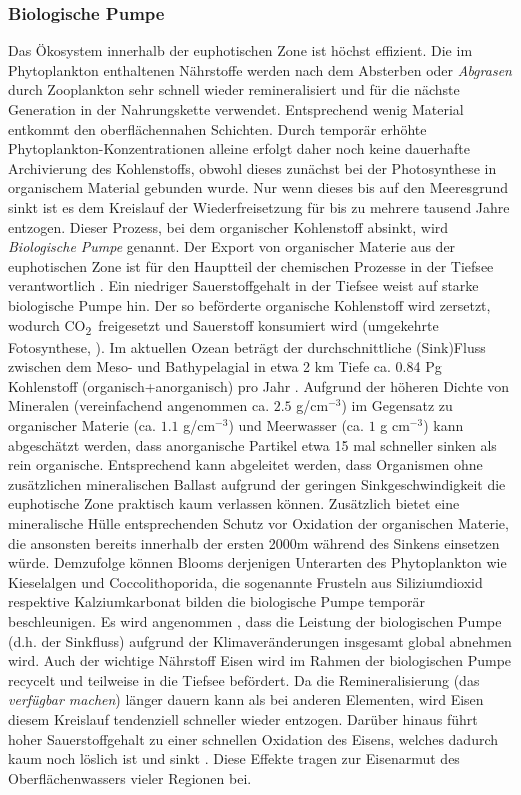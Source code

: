 \documentclass[12pt,a4paper,onecolumn,draft]{scrartcl}
\newcommand{\cotwo}{CO\textsubscript{2}}
\begin{document}
\subsubsection{Biologische Pumpe} \label{sec:biopump}
Das Ökosystem innerhalb der euphotischen Zone ist höchst effizient. Die im Phytoplankton enthaltenen Nährstoffe werden nach dem Absterben oder \textit{Abgrasen} durch Zooplankton sehr schnell wieder remineralisiert und für die nächste Generation in der Nahrungskette verwendet. Entsprechend wenig Material entkommt den oberflächennahen Schichten. Durch temporär erhöhte Phytoplankton-Konzentrationen alleine erfolgt daher noch keine dauerhafte Archivierung des Kohlenstoffs, obwohl dieses zunächst bei der Photosynthese in organischem Material gebunden wurde. Nur wenn dieses bis auf den Meeresgrund sinkt ist es dem Kreislauf der Wiederfreisetzung für bis zu mehrere tausend Jahre entzogen. Dieser Prozess, bei dem organischer Kohlenstoff absinkt, wird \textit{Biologische Pumpe} genannt. Der Export von organischer Materie aus der euphotischen Zone ist für den Hauptteil der chemischen Prozesse in der Tiefsee verantwortlich \citep{Emerson.2009}. Ein niedriger Sauerstoffgehalt in der Tiefsee weist auf starke biologische Pumpe hin. Der so beförderte organische Kohlenstoff wird zersetzt, wodurch \cotwo \ freigesetzt und Sauerstoff konsumiert wird (umgekehrte Fotosynthese, \cite{Honjo.2008}). Im aktuellen Ozean beträgt der durchschnittliche (Sink)Fluss zwischen dem Meso- und Bathypelagial in etwa 2 km Tiefe ca. 0.84 Pg Kohlenstoff (organisch+anorganisch) pro Jahr \citep{Honjo.2008}. Aufgrund der höheren Dichte von Mineralen (vereinfachend angenommen ca. $2.5$ g/cm$^{-3}$) im Gegensatz zu organischer Materie (ca. $1.1$ g/cm$^{-3}$) und Meerwasser (ca. $1$ g cm$^{-3}$) kann abgeschätzt werden, dass anorganische Partikel etwa 15 mal schneller sinken als rein organische. Entsprechend kann abgeleitet werden, dass Organismen ohne zusätzlichen mineralischen Ballast aufgrund der geringen Sinkgeschwindigkeit die euphotische Zone praktisch kaum verlassen können. Zusätzlich bietet eine mineralische Hülle entsprechenden Schutz vor Oxidation der organischen Materie, die ansonsten bereits innerhalb der ersten 2000m während des Sinkens einsetzen würde\citep{Emerson.2009}. Demzufolge können Blooms derjenigen Unterarten des Phytoplankton wie Kieselalgen und Coccolithoporida, die sogenannte Frusteln aus Siliziumdioxid respektive Kalziumkarbonat bilden die biologische Pumpe temporär beschleunigen. Es wird angenommen , dass die Leistung der biologischen Pumpe (d.h. der Sinkfluss) aufgrund der Klimaveränderungen insgesamt global abnehmen wird. Auch der wichtige Nährstoff Eisen wird im Rahmen der biologischen Pumpe recycelt und teilweise in die Tiefsee befördert. Da die Remineralisierung (das \textit{verfügbar machen}) länger dauern kann als bei anderen Elementen, wird Eisen diesem Kreislauf tendenziell schneller wieder entzogen. Darüber hinaus führt hoher Sauerstoffgehalt zu einer schnellen Oxidation des Eisens, welches dadurch kaum noch löslich ist und sinkt \citep{Falkowski.1998}. Diese  Effekte tragen zur Eisenarmut des Oberflächenwassers vieler Regionen bei.
\end{document}
